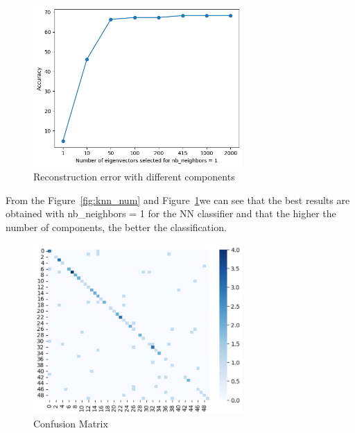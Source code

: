 \begin{figure}[h]
	\centering
	\includegraphics[width=8.0cm]{./Ressources/accuracy_1neighbors.png}
	\caption{Reconstruction error with different components}
	\label{fig:n_num}
\end{figure}
From the Figure~\ref{fig:knn_num} and Figure~\ref{fig:n_num}we can see that the best results are obtained with nb\_neighbors = 1 for the NN classifier and that the higher the number of components, the better the classification.

\begin{figure}[h]
	\centering
	\includegraphics[width=8.0cm]{./Ressources/Q1_cm.png}
	\caption{Confusion Matrix}
	\label{fig:Q1_cm}
\end{figure}




